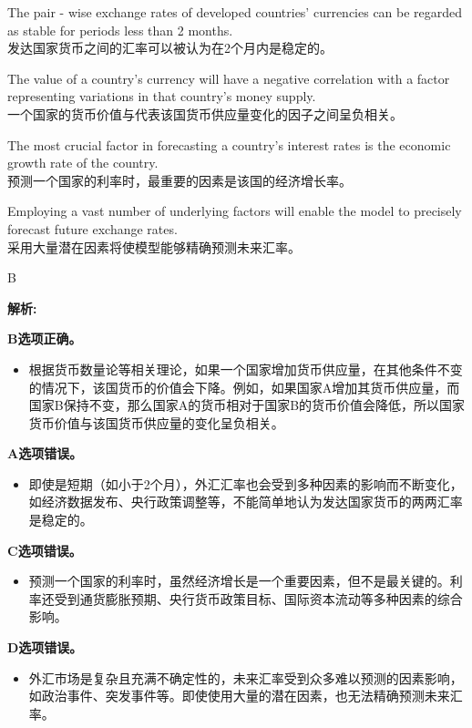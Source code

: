 \documentclass{article}
\newenvironment{explanation}
{\textbf{解析:}\par}
{\par}
\begin{document}
    \begin{choices}
        \item The pair - wise exchange rates of developed countries' currencies can be regarded as stable for periods less than 2 months.\\
        发达国家货币之间的汇率可以被认为在2个月内是稳定的。
        \item The value of a country's currency will have a negative correlation with a factor representing variations in that country's money supply.\\
        一个国家的货币价值与代表该国货币供应量变化的因子之间呈负相关。
        \item The most crucial factor in forecasting a country's interest rates is the economic growth rate of the country.\\
        预测一个国家的利率时，最重要的因素是该国的经济增长率。
        \item Employing a vast number of underlying factors will enable the model to precisely forecast future exchange rates.\\
        采用大量潜在因素将使模型能够精确预测未来汇率。
    \end{choices}
    
    \begin{correctanswer}
        B
    \end{correctanswer}
    
    \begin{explanation}
    \textbf{B选项正确。}
    \begin{itemize}
        \item 根据货币数量论等相关理论，如果一个国家增加货币供应量，在其他条件不变的情况下，该国货币的价值会下降。例如，如果国家A增加其货币供应量，而国家B保持不变，那么国家A的货币相对于国家B的货币价值会降低，所以国家货币价值与该国货币供应量的变化呈负相关。
    \end{itemize}
    \textbf{A选项错误。}
    \begin{itemize}
        \item 即使是短期（如小于2个月），外汇汇率也会受到多种因素的影响而不断变化，如经济数据发布、央行政策调整等，不能简单地认为发达国家货币的两两汇率是稳定的。
    \end{itemize}
    \textbf{C选项错误。}
    \begin{itemize}
        \item 预测一个国家的利率时，虽然经济增长是一个重要因素，但不是最关键的。利率还受到通货膨胀预期、央行货币政策目标、国际资本流动等多种因素的综合影响。
    \end{itemize}
    \textbf{D选项错误。}
    \begin{itemize}
        \item 外汇市场是复杂且充满不确定性的，未来汇率受到众多难以预测的因素影响，如政治事件、突发事件等。即使使用大量的潜在因素，也无法精确预测未来汇率。
    \end{itemize}
    \end{explanation}
    
\end{document}
